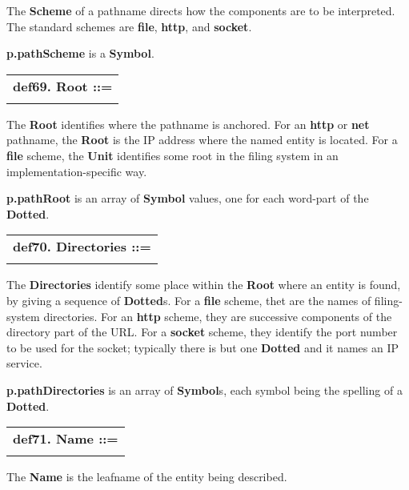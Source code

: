 \documentclass{report}
\begin{document}
The {\bf Scheme} of a pathname directs how the components are to be interpreted.
The standard schemes are {\bf file}, {\bf http}, and {\bf socket}.

{\bf p.pathScheme} is a {\bf Symbol}.

\begin{tabular}{l}
{\bf def69. Root ::= }\\ 
\hspace*{3mm}{\tt "//" Dotted} \\ 
\end{tabular}



The {\bf Root} identifies where the pathname is anchored. For an {\bf http} or {\bf net}
pathname, the {\bf Root} is the IP address where the named entity is located. For
a {\bf file} scheme, the {\bf Unit} identifies some root in the filing system in
an implementation-specific way.

{\bf p.pathRoot} is an array of {\bf Symbol} values, one for each word-part of the
{\bf Dotted}.

\begin{tabular}{l}
{\bf def70. Directories ::= }\\ 
\hspace*{3mm}{\tt {[}("/"){]} (Dotted "/")++} \\ 
\end{tabular}



The {\bf Directories} identify some place within the {\bf Root} where an entity is
found, by giving a sequence of {\bf Dotted}s. For a {\bf file} scheme, thet are the
names of filing-system directories. For an {\bf http} scheme, they are successive
components of the directory part of the URL. For a {\bf socket} scheme, they
identify the port number to be used for the socket; typically there is but one
{\bf Dotted} and it names an IP service.

{\bf p.pathDirectories} is an array of {\bf Symbol}s, each symbol being the spelling
of a {\bf Dotted}.

\begin{tabular}{l}
{\bf def71. Name ::= }\\ 
\hspace*{3mm}{\tt Word} \\ 
\end{tabular}



The {\bf Name} is the leafname of the entity being described.
\end{document}
